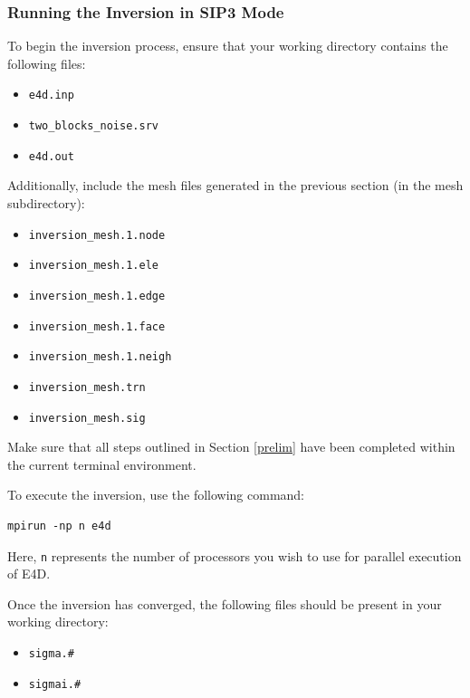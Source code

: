 \documentclass[a4paper,12pt]{article}
\begin{document}
\subsubsection{Running the Inversion in SIP3 Mode}

To begin the inversion process, ensure that your working directory contains the
following files:

\begin{itemize}
    \item \texttt{e4d.inp}
    \item \texttt{two\_blocks\_noise.srv}
    \item \texttt{e4d.out}
\end{itemize}

Additionally, include the mesh files generated in the previous section (in the mesh subdirectory):

\begin{itemize}
    \item \texttt{inversion\_mesh.1.node}
    \item \texttt{inversion\_mesh.1.ele}
    \item \texttt{inversion\_mesh.1.edge}
    \item \texttt{inversion\_mesh.1.face}
    \item \texttt{inversion\_mesh.1.neigh}
    \item \texttt{inversion\_mesh.trn}
    \item \texttt{inversion\_mesh.sig}
\end{itemize}

Make sure that all steps outlined in Section \ref{prelim} have been completed
within the current terminal environment.

To execute the inversion, use the following command:

\begin{verbatim}
mpirun -np n e4d
\end{verbatim}

Here, \texttt{n} represents the number of processors you wish to use for
parallel execution of E4D.

Once the inversion has converged, the following files should be present in your
working directory:

\begin{itemize}
    \item \texttt{sigma.\#}
    \item \texttt{sigmai.\#}
\end{itemize}
\end{document}
